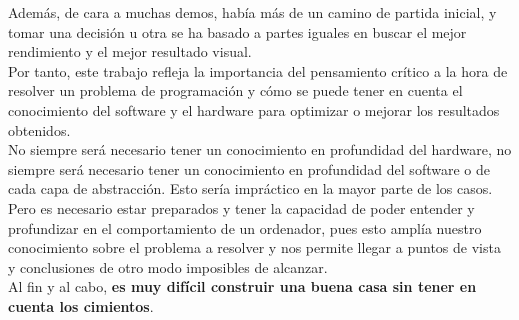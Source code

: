 Además, de cara a muchas demos, había más de un camino de partida inicial, y tomar una decisión u otra se ha basado a partes iguales en buscar el mejor rendimiento y el mejor resultado visual.\\

Por tanto, este trabajo refleja la importancia del pensamiento crítico a la hora de resolver un problema de programación y cómo se puede tener en cuenta el conocimiento del software y el hardware para optimizar o mejorar los resultados obtenidos.\\

No siempre será necesario tener un conocimiento en profundidad del hardware, no siempre será necesario tener un conocimiento en profundidad del software o de cada capa de abstracción. Esto sería impráctico en la mayor parte de los casos. Pero es necesario estar preparados y tener la capacidad de poder entender y profundizar en el comportamiento de un ordenador, pues esto amplía nuestro conocimiento sobre el problema a resolver y nos permite llegar a puntos de vista y conclusiones de otro modo imposibles de alcanzar.\\

Al fin y al cabo, \textbf{es muy difícil construir una buena casa sin tener en cuenta los cimientos}.